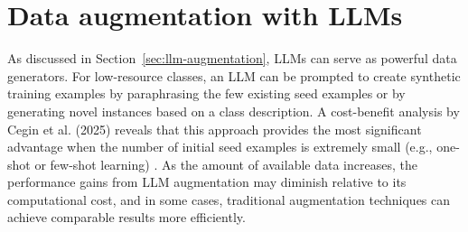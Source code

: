 \section{Data augmentation with LLMs}
As discussed in Section~\ref{sec:llm-augmentation}, LLMs can serve as powerful data generators. For low-resource classes, an LLM can be prompted to create synthetic training examples by paraphrasing the few existing seed examples or by generating novel instances based on a class description. A cost-benefit analysis by Cegin et al. (2025) reveals that this approach provides the most significant advantage when the number of initial seed examples is extremely small (e.g., one-shot or few-shot learning) \cite{cegin-etal-2025-llms}. As the amount of available data increases, the performance gains from LLM augmentation may diminish relative to its computational cost, and in some cases, traditional augmentation techniques can achieve comparable results more efficiently.
